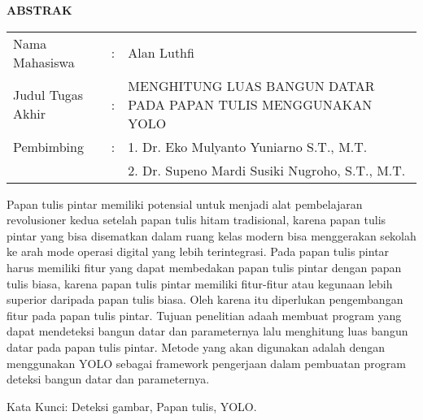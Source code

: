 \begin{center}
  \large\textbf{ABSTRAK}
\end{center}


\vspace{2ex}

\begingroup
  \setlength{\tabcolsep}{0pt}

  \noindent
  \begin{tabularx}{\textwidth}{l >{\centering}m{2em} X}
    Nama Mahasiswa    &:& Alan Luthfi \\

    Judul Tugas Akhir &:&	{MENGHITUNG LUAS BANGUN DATAR PADA PAPAN TULIS MENGGUNAKAN YOLO} \\

    Pembimbing        &:& 1. Dr. Eko Mulyanto Yuniarno S.T., M.T. \\
                      & & 2. Dr. Supeno Mardi Susiki Nugroho, S.T., M.T. \\
  \end{tabularx}
\endgroup

Papan tulis pintar memiliki potensial untuk menjadi alat pembelajaran revolusioner kedua
setelah papan tulis hitam tradisional, karena papan tulis pintar yang bisa disematkan dalam
ruang kelas modern bisa menggerakan sekolah ke arah mode operasi digital yang lebih terintegrasi. Pada papan tulis pintar harus memiliki fitur yang dapat membedakan papan tulis pintar
dengan papan tulis biasa, karena papan tulis pintar memiliki fitur-fitur atau kegunaan lebih
superior daripada papan tulis biasa. Oleh karena itu diperlukan pengembangan fitur pada papan tulis pintar. Tujuan penelitian adaah membuat program yang dapat mendeteksi bangun
datar dan parameternya lalu menghitung luas bangun datar pada papan tulis pintar. Metode
yang akan digunakan adalah dengan menggunakan YOLO sebagai framework pengerjaan dalam
pembuatan program deteksi bangun datar dan parameternya.

Kata Kunci: Deteksi gambar, Papan tulis, YOLO.
